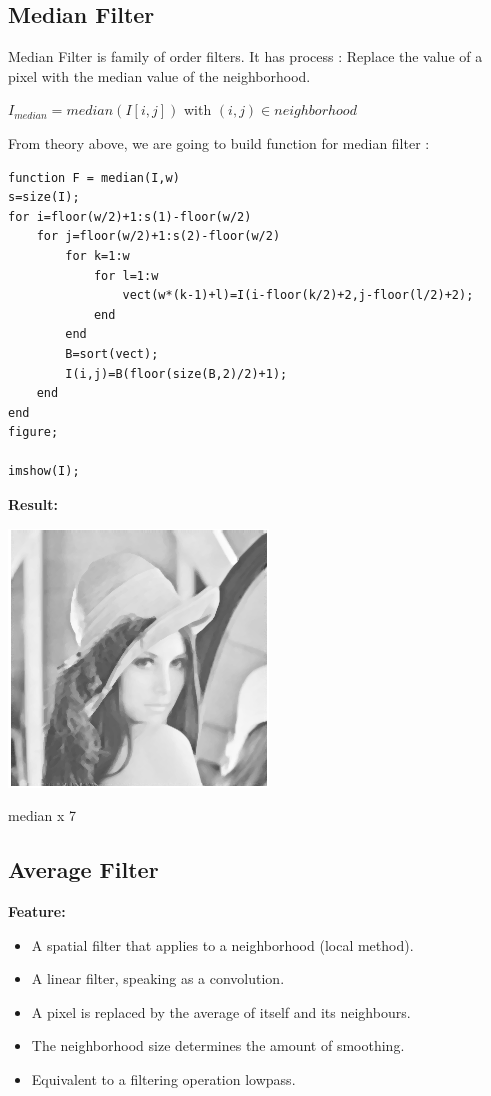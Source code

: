 \documentclass[10pt]{article}
\begin{document}
\subsection{Median Filter}
Median Filter is family of order filters. It has process : Replace the value of a pixel with the median value of the neighborhood.

$I_{median} = median(I[i,j])$  with $(i,j)\in neighborhood$

From theory above, we are going to build function for median filter :

\begin{lstlisting}
function F = median(I,w)
s=size(I);
for i=floor(w/2)+1:s(1)-floor(w/2)
	for j=floor(w/2)+1:s(2)-floor(w/2)
		for k=1:w
			for l=1:w
				vect(w*(k-1)+l)=I(i-floor(k/2)+2,j-floor(l/2)+2);
			end
		end
		B=sort(vect);
		I(i,j)=B(floor(size(B,2)/2)+1);
	end
end
figure;

imshow(I);

\end{lstlisting}


\textbf{Result:}

\begin{center}
	\includegraphics{median1.png}
	
	median x 7
\end{center}

\subsection{Average Filter}
\textbf{Feature: }
\begin{itemize}
	\item A spatial filter that applies to a neighborhood (local method).
	\item A linear filter, speaking as a convolution.
	\item A pixel is replaced by the average of itself and its neighbours.
	\item The neighborhood size determines the amount of smoothing.
    \item Equivalent to a filtering operation lowpass.
\end{itemize}
\end{document}

